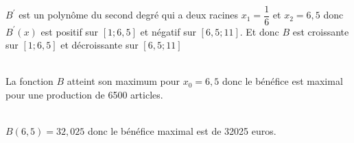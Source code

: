 \documentclass[12pt,a4paper]{book}
\begin{document}
\begin{enumMet}
\begin{enumMet}
            \item {}\\
            $B^{\prime}$ est un polynôme du second degré qui a deux racines $x_{1}=\dfrac{1}{6}$ et $x_{2}=6,5$ donc
    $B^{\prime}(x)$ est positif sur $[1 ; 6,5]$ et négatif sur $[6,5 ; 11]$. Et donc $B$ est croissante sur $[1 ; 6,5]$ et décroissante sur $[6,5 ; 11]$\\
    \item {}\\
    La fonction $B$ atteint son maximum pour $x_{0}=6,5$ donc le bénéfice est maximal pour une production de 6500 articles. 
    \item {}\\
    $B(6,5)=32,025$ donc le bénéfice maximal est de 32025 euros.
    \end{enumMet}
\end{enumMet}
\end{document}
